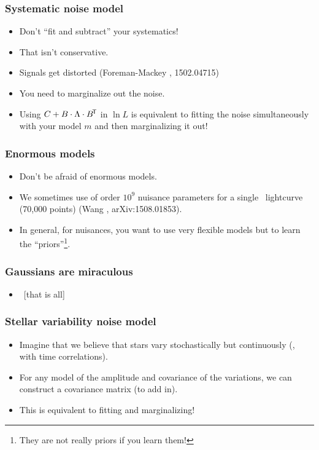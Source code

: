 \documentclass[pdftex]{beamer}
\begin{document}
\begin{frame}
  \frametitle{Systematic noise model}
  \begin{itemize}
  \item Don't ``fit and subtract'' your systematics!
  \item That isn't conservative.
  \item Signals get distorted {\footnotesize (Foreman-Mackey \etal, 1502.04715)}
  \item You need to marginalize out the noise.
  \item Using $C + B\cdot\Lambda\cdot{B}^{\mathsf{\!T}}$ in $\ln L$ is
    equivalent to fitting the noise simultaneously with your model $m$
    and then marginalizing it out!
  \end{itemize}
\end{frame}

\begin{frame}
  \frametitle{Enormous models}
  \begin{itemize}
  \item Don't be afraid of enormous models.
  \item We sometimes use of order $10^9$ nuisance parameters for a
    single \kepler\ lightcurve (70,000 points) {\footnotesize (Wang
      \etal, arXiv:1508.01853)}.
  \item In general, for nuisances, you want to use very flexible
    models but to learn the ``priors''\footnote{They are not really
      priors if you learn them!}.
  \end{itemize}
\end{frame}

\begin{frame}
  \frametitle{Gaussians are miraculous}
  \begin{itemize}
  \item ~[that is all]
  \end{itemize}
\end{frame}

\begin{frame}
  \frametitle{Stellar variability noise model}
  \begin{itemize}
  \item Imagine that we believe that stars vary stochastically but
    continuously (\ie, with time correlations).
  \item For any model of the amplitude and covariance of the
    variations, we can construct a covariance matrix (to add in).
  \item This is equivalent to fitting and marginalizing!
  \end{itemize}
\end{frame}
\end{document}
